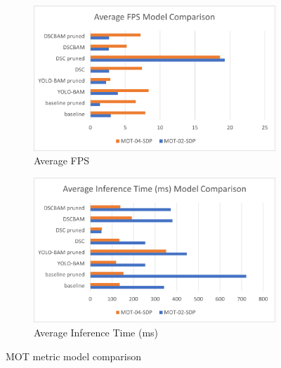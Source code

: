 \begin{figure}[!htbp]
\centering
\begin{subfigure}{.5\textwidth}
  \centering
  \includegraphics[width=0.99\linewidth]{images/AveFPS.png}
  \caption{Average FPS}
  \label{fig:avefps}
\end{subfigure}%
\begin{subfigure}{.5\textwidth}
  \centering
  \includegraphics[width=0.99\linewidth]{images/AveInfT.png}
  \caption{Average Inference Time (ms)}
  \label{fig:aveinft}
\end{subfigure}
\caption{MOT metric model comparison}
\label{fig:motresults}
\end{figure}



